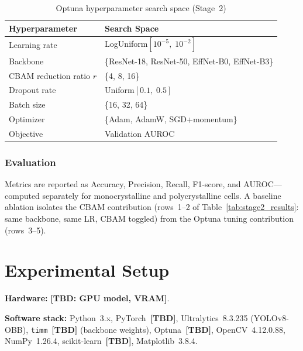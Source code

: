 \documentclass[conference]{IEEEtran}
\begin{document}
\begin{table}[t]
  \caption{Optuna hyperparameter search space (Stage~2)}
  \label{tab:optuna}
  \begin{center}
  \renewcommand{\arraystretch}{1.05}
  \begin{tabular}{ll}
    \toprule
    \textbf{Hyperparameter} & \textbf{Search Space} \\
    \midrule
    Learning rate & LogUniform$[10^{-5},\;10^{-2}]$ \\
    Backbone & \{ResNet-18, ResNet-50, EffNet-B0, EffNet-B3\} \\
    CBAM reduction ratio $r$ & \{4, 8, 16\} \\
    Dropout rate & Uniform$[0.1,\;0.5]$ \\
    Batch size & \{16, 32, 64\} \\
    Optimizer & \{Adam, AdamW, SGD+momentum\} \\
    Objective & Validation AUROC \\
    \bottomrule
  \end{tabular}
  \end{center}
\end{table}

\subsubsection{Evaluation}

Metrics are reported as Accuracy, Precision, Recall,
F1-score, and AUROC---computed separately for monocrystalline
and polycrystalline cells. A baseline ablation isolates the
CBAM contribution (rows~1--2 of Table~\ref{tab:stage2_results}:
same backbone, same LR, CBAM toggled) from the Optuna
tuning contribution (rows~3--5).

\section{Experimental Setup}

\textbf{Hardware:} \textbf{[TBD: GPU model, VRAM]}.

\textbf{Software stack:} Python~3.x, PyTorch~\textbf{[TBD]},
Ultralytics~8.3.235 (YOLOv8-OBB), \texttt{timm}~\textbf{[TBD]}
(backbone weights), Optuna~\textbf{[TBD]},
OpenCV~4.12.0.88, NumPy~1.26.4, scikit-learn~\textbf{[TBD]},
Matplotlib~3.8.4.
\end{document}
